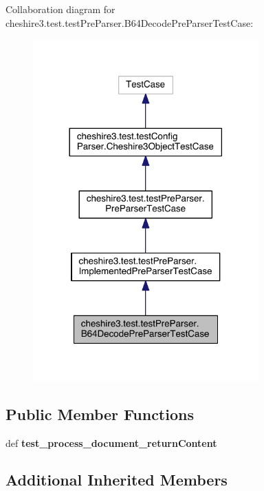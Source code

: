 Collaboration diagram for cheshire3.\-test.\-test\-Pre\-Parser.\-B64\-Decode\-Pre\-Parser\-Test\-Case\-:
\nopagebreak
\begin{figure}[H]
\begin{center}
\leavevmode
\includegraphics[width=246pt]{classcheshire3_1_1test_1_1test_pre_parser_1_1_b64_decode_pre_parser_test_case__coll__graph}
\end{center}
\end{figure}
\subsection*{Public Member Functions}
\begin{DoxyCompactItemize}
\item 
\hypertarget{classcheshire3_1_1test_1_1test_pre_parser_1_1_b64_decode_pre_parser_test_case_a9ca8b298d8153c538fb3fcbe7daa5f84}{def {\bfseries test\-\_\-process\-\_\-document\-\_\-return\-Content}}\label{classcheshire3_1_1test_1_1test_pre_parser_1_1_b64_decode_pre_parser_test_case_a9ca8b298d8153c538fb3fcbe7daa5f84}

\end{DoxyCompactItemize}
\subsection*{Additional Inherited Members}


